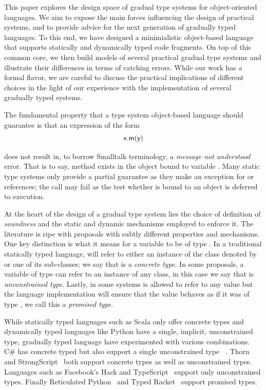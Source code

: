 \documentclass[a4paper,USenglish]{tex/lipics-v2016}
\begin{document}
This paper explores the design space of gradual type systems for
object-oriented languages. We aim to expose the main forces influencing the
design of practical systems, and to provide advice for the next generation
of gradually typed languages. To this end, we have designed a minimialistic
object-based language that supports statically and dynamically typed code
fragments. On top of this common core, we then build models of several
practical gradual type systems and illustrate their differences in terms of
catching errors. While our work has a formal flavor, we are careful to
discuss the practical implications of different choices in the light of
our experience with the implementation of several gradually typed systems.

The fundamental property that a type system object-based language should
guarantee is that an expression of the form 
\vspace{-1mm}\[ {\sf{x.m(y)}} \]

\vspace{-1mm}\noindent does not result in, to borrow Smalltalk terminology,
a \emph{message not understood} error.  That is to say, method  exists
in the object bound to variable \x. Many static type systems only
provide a partial guarantee as they make an exception for  or
 references; the call may fail as the test whether \x is
bound to an object is deferred to execution.

At the heart of the design of a gradual type system lies the choice of
definition of \emph{soundness} and the static and dynamic mechanisms
employed to enforce it. The literature is ripe with proposals with subtly
different properties and mechanisms.  One key distinction is what it means
for a variable \x to be of type \T. In a traditional statically typed
language, \x will refer to either an instance of the class denoted by \T or
one of its sub-classes; we say that \T is a \emph{concrete type}. In some
proposals, a variable \x of type \T can refer to an instance of any class,
in this case we say that \T is \emph{unconstrained type}. Lastly, in some
systems \x is allowed to refer to any value but the language implementation
will ensure that the value behaves as if it was of type \T, we call this a
\emph{promised type}.

While statically typed languages such as Scala only offer concrete types and
dynamically typed languages like Python have a single, implicit,
unconstrained type, gradually typed language have experimented with various
combinations.  C\# has concrete typed but also support a single
unconstrained type ~\cite{Bierman10}. Thorn~\cite{popl10} and
StrongScript~\cite{ecoop15} both support concrete types as well as
unconstrained types. Languages such as Facebook's Hack and
TypeScript~\cite{typescript13} support only unconstrained types.  Finally
Reticulated Python~\cite{siek14} and Typed Racket~\cite{tf-dls06} support
promised types.
\end{document}
